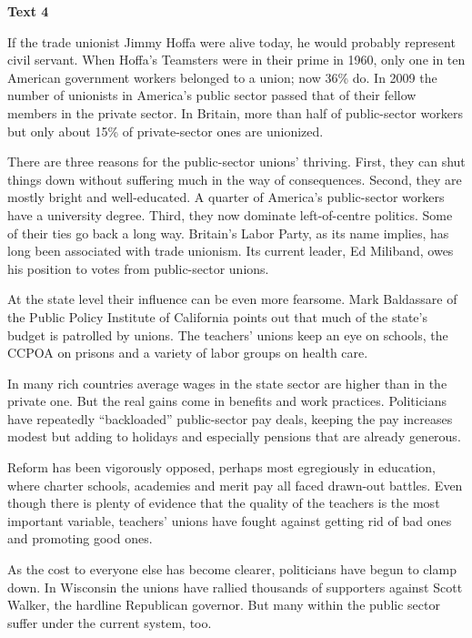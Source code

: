 \begin{center}\textbf{Text 4}\end{center}

If the trade unionist Jimmy Hoffa were alive today, he would probably represent civil servant.
When Hoffa’s Teamsters were in their prime in 1960, only one in ten American government workers
belonged to a union; now 36\% do. In 2009 the number of unionists in America’s public sector 
passed that of their fellow members in the private sector. In Britain, more than half of public-sector 
workers but only about 15\% of private-sector ones are unionized.

There are three reasons for the public-sector unions’ thriving. First, they can shut things down without suffering much in the way of consequences. Second, they are mostly bright and well-educated. A quarter of America’s public-sector workers have a university degree. Third, they now dominate left-of-centre politics. Some of their ties go back a long way. Britain’s Labor Party, as its name implies, has long been associated with trade unionism. Its current leader, Ed Miliband, owes his position to votes from public-sector unions.

At the state level their influence can be even more fearsome. Mark Baldassare of the Public Policy Institute of California points out that much of the state’s budget is patrolled by unions. The teachers’ unions keep an eye on schools, the CCPOA on prisons and a variety of labor groups on health care.

In many rich countries average wages in the state sector are higher than in the private one. But the real gains come in benefits and work practices. Politicians have repeatedly “backloaded” public-sector pay deals, keeping the pay increases modest but adding to holidays and especially pensions that are already generous.

Reform has been vigorously opposed, perhaps most egregiously in education, where charter schools, academies and merit pay all faced drawn-out battles. Even though there is plenty of evidence that the quality of the teachers is the most important variable, teachers’ unions have fought against getting rid of bad ones and promoting good ones.

As the cost to everyone else has become clearer, politicians have begun to clamp down. In Wisconsin the unions have rallied thousands of supporters against Scott Walker, the hardline Republican governor. But many within the public sector suffer under the current system, too.

